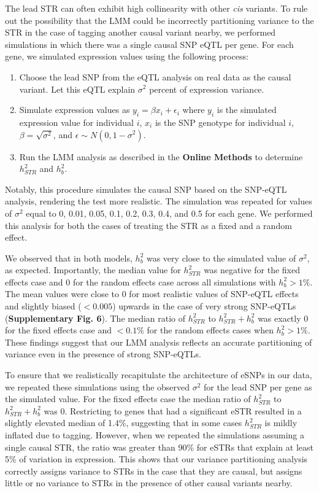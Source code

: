 The lead STR can often exhibit high collinearity with other \emph{cis} variants. To rule out the possibility that the LMM could be incorrectly partitioning variance to the STR in the case of tagging another causal variant nearby, we performed simulations in which there was a single causal SNP eQTL per gene. For each gene, we simulated expression values using the following process:

\begin{enumerate}
\item Choose the lead SNP from the eQTL analysis on real data as the causal variant. Let this eQTL explain $\sigma^2$ percent of expression variance.
\item Simulate expression values as $y_i=\beta x_i+\epsilon_i$ where $y_i$ is the simulated expression value for individual $i$, $x_i$ is the SNP genotype for individual $i$, $\beta = \sqrt{\sigma^2}$, and $\epsilon \sim N(0, 1-\sigma^2)$.
\item Run the LMM analysis as described in the \textbf{Online Methods} to determine $h^2_{STR}$ and $h^2_{b}$.
\end{enumerate}

Notably, this procedure simulates the causal SNP based on the SNP-eQTL analysis, rendering the test more realistic.
The simulation was repeated for values of $\sigma^2$ equal to 0, 0.01, 0.05, 0.1, 0.2, 0.3, 0.4, and 0.5 for each gene. We performed this analysis for both the cases of treating the STR as a fixed and a random effect.

We observed that in both models, $h^2_{b}$ was very close to the simulated value of $\sigma^2$, as expected. Importantly, the median value for $h^2_{STR}$ was negative for the fixed effects case and 0 for the random effects case across all simulations with $h^2_b>1\%$. The mean values were close to 0 for most realistic values of SNP-eQTL effects and slightly biased ($<0.005$) upwards in the case of very strong SNP-eQTLs (\textbf{Supplementary Fig. 6}). The median ratio of $h^2_{STR}$ to $h^2_{STR}+h^2_{b}$ was exactly 0 for the fixed effects case and $<0.1\%$ for the random effects cases when $h^2_b>1\%$. These findings suggest that our LMM analysis reflects an accurate partitioning of variance even in the presence of strong SNP-eQTLs.

To ensure that we realistically recapitulate the architecture of eSNPs in our data, we repeated these simulations using the observed $\sigma^2$ for the lead SNP per gene as the simulated value. For the fixed effects case the median ratio of $h^2_{STR}$ to $h^2_{STR}+h^2_{b}$ was 0. Restricting to genes that had a significant eSTR resulted in a slightly elevated median of 1.4\%, suggesting that in some cases $h^2_{STR}$ is mildly inflated due to tagging. However, when we repeated the simulations assuming a single causal STR, the ratio was greater than 90\% for eSTRs that explain at least 5\% of variation in expression. This shows that our variance partitioning analysis correctly assigns variance to STRs in the case that they are causal, but assigns little or no variance to STRs in the presence of other causal variants nearby.

